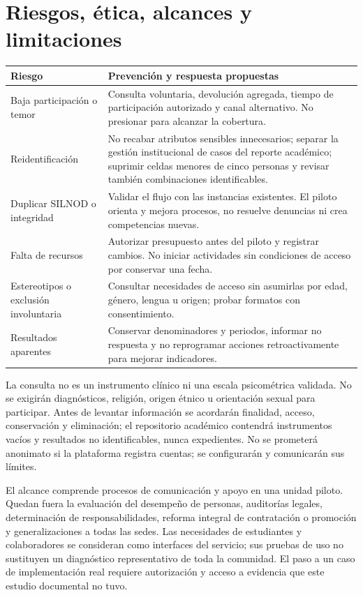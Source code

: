 \documentclass[12pt,letterpaper,oneside]{article}
\begin{document}
\section{Riesgos, ética, alcances y limitaciones}
\begin{longtable}{@{}L{.27\textwidth}L{.66\textwidth}@{}}
\toprule \textbf{Riesgo} & \textbf{Prevención y respuesta propuestas} \\
\midrule\endhead
Baja participación o temor & Consulta voluntaria, devolución agregada, tiempo de participación autorizado y canal alternativo. No presionar para alcanzar la cobertura. \\
Reidentificación & No recabar atributos sensibles innecesarios; separar la gestión institucional de casos del reporte académico; suprimir celdas menores de cinco personas y revisar también combinaciones identificables. \\
Duplicar SILNOD o integridad & Validar el flujo con las instancias existentes. El piloto orienta y mejora procesos, no resuelve denuncias ni crea competencias nuevas. \\
Falta de recursos & Autorizar presupuesto antes del piloto y registrar cambios. No iniciar actividades sin condiciones de acceso por conservar una fecha. \\
Estereotipos o exclusión involuntaria & Consultar necesidades de acceso sin asumirlas por edad, género, lengua u origen; probar formatos con consentimiento. \\
Resultados aparentes & Conservar denominadores y periodos, informar no respuesta y no reprogramar acciones retroactivamente para mejorar indicadores. \\
\bottomrule
\end{longtable}
La consulta no es un instrumento clínico ni una escala psicométrica validada. No se exigirán diagnósticos, religión, origen étnico u orientación sexual para participar. Antes de levantar información se acordarán finalidad, acceso, conservación y eliminación; el repositorio académico contendrá instrumentos vacíos y resultados no identificables, nunca expedientes. No se prometerá anonimato si la plataforma registra cuentas; se configurarán y comunicarán sus límites.

El alcance comprende procesos de comunicación y apoyo en una unidad piloto. Quedan fuera la evaluación del desempeño de personas, auditorías legales, determinación de responsabilidades, reforma integral de contratación o promoción y generalizaciones a todas las sedes. Las necesidades de estudiantes y colaboradores se consideran como interfaces del servicio; sus pruebas de uso no sustituyen un diagnóstico representativo de toda la comunidad. El paso a un caso de implementación real requiere autorización y acceso a evidencia que este estudio documental no tuvo.
\end{document}
